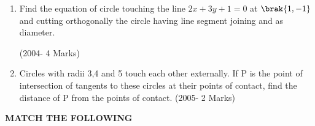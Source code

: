 \documentclass[journal,12pt,twocolumn]{IEEEtran}
\theoremstyle{remark}
\begin{document}
\begin{enumerate}
\item Find the equation of circle touching the line $2x+3y+1=0$ at $\brak{1,-1}$ and cutting orthogonally the circle having line segment joining  and  as diameter.\hfill

(2004- 4 Marks)\\     




\item Circles with radii 3,4 and 5 touch each other externally. If P is the point of intersection of tangents to these circles at their points of contact, find the distance of P from the points of contact.
	           \hfill(2005- 2 Marks)\\ 
\end{enumerate}
\newpage

\textbf{MATCH THE FOLLOWING}\\
\end{document}
